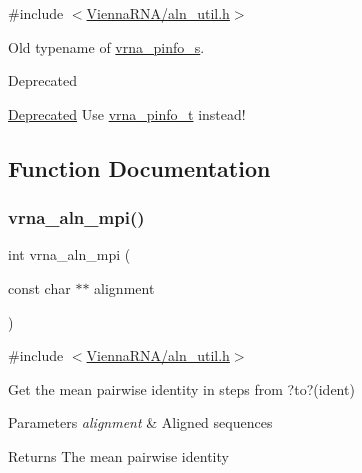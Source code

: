 {\ttfamily \#include $<$\hyperlink{aln__util_8h}{Vienna\+R\+N\+A/aln\+\_\+util.\+h}$>$}



Old typename of \hyperlink{group__aln__utils_structvrna__pinfo__s}{vrna\+\_\+pinfo\+\_\+s}. 

\begin{DoxyRefDesc}{Deprecated}
\item[\hyperlink{deprecated__deprecated000026}{Deprecated}]Use \hyperlink{group__aln__utils_ga6660dfca23debee7306e0cd53341263f}{vrna\+\_\+pinfo\+\_\+t} instead! \end{DoxyRefDesc}


\subsection{Function Documentation}
\mbox{\label{group__aln__utils_gade5a1f2d16e7fd9a57b37d8514f08e8e}} 
\subsubsection{\texorpdfstring{vrna\+\_\+aln\+\_\+mpi()}{vrna\_aln\_mpi()}}
{\footnotesize\ttfamily int vrna\+\_\+aln\+\_\+mpi (\begin{DoxyParamCaption}\item[{const char $\ast$$\ast$}]{alignment }\end{DoxyParamCaption})}



{\ttfamily \#include $<$\hyperlink{aln__util_8h}{Vienna\+R\+N\+A/aln\+\_\+util.\+h}$>$}



Get the mean pairwise identity in steps from ?to?(ident) 


\begin{DoxyParams}{Parameters}
{\em alignment} & Aligned sequences \\
\hline
\end{DoxyParams}
\begin{DoxyReturn}{Returns}
The mean pairwise identity 
\end{DoxyReturn}
\mbox{\label{group__aln__utils_gaf6421a1318586c59fea6a127ed9f65f3}} 
